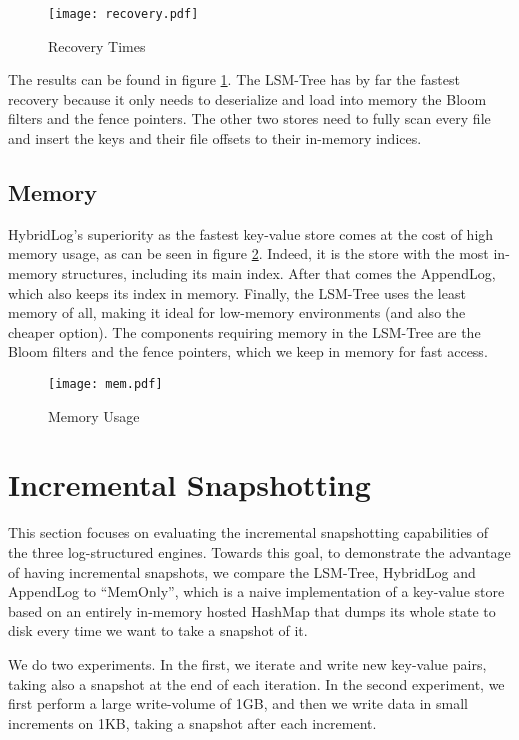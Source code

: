 \begin{figure}[h]
    \centering
    \texttt{[image: recovery.pdf]}
    \caption{Recovery Times}
    \label{fig:recovery}
\end{figure}

The results can be found in figure \ref{fig:recovery}. The LSM-Tree has by far the fastest recovery because it only needs to deserialize and load into memory the Bloom filters and the fence pointers. The other two stores need to fully scan every file and insert the keys and their file offsets to their in-memory indices.

\subsection{Memory}

HybridLog's superiority as the fastest key-value store comes at the cost of high memory usage, as can be seen in figure \ref{fig:comparison-memory}. Indeed, it is the store with the most in-memory structures, including its main index. After that comes the AppendLog, which also keeps its index in memory. Finally, the LSM-Tree uses the least memory of all, making it ideal for low-memory environments (and also the cheaper option). The components requiring memory in the LSM-Tree are the Bloom filters and the fence pointers, which we keep in memory for fast access.

\begin{figure}[h]
    \centering
    \texttt{[image: mem.pdf]}
    \caption{Memory Usage}
    \label{fig:comparison-memory}
\end{figure}

\section{Incremental Snapshotting}

This section focuses on evaluating the incremental snapshotting capabilities of the three log-structured engines. Towards this goal, to demonstrate the advantage of having incremental snapshots, we compare the LSM-Tree, HybridLog and AppendLog to ``MemOnly'', which is a naive implementation of a key-value store based on an entirely in-memory hosted HashMap that dumps its whole state to disk every time we want to take a snapshot of it.

We do two experiments. In the first, we iterate and write new key-value pairs, taking also a snapshot at the end of each iteration. In the second experiment, we first perform a large write-volume of 1GB, and then we write data in small increments on 1KB, taking a snapshot after each increment.

